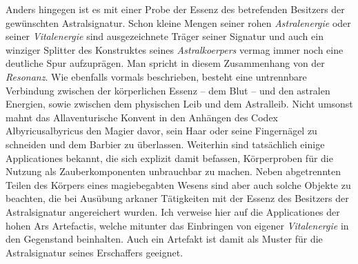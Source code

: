 \documentclass[a5paper,8pt]{book}
\begin{document}
\begin{multicols}{2}
Anders hingegen ist es mit einer Probe der Essenz des betrefenden Besitzers der gewünschten Astralsignatur. Schon kleine
Mengen seiner rohen \textit{Astralenergie} oder seiner \textit{Vitalenergie} sind ausgezeichnete Träger seiner Signatur und
auch ein winziger Splitter des Konstruktes seines \textit{Astralkoerpers} vermag immer noch eine deutliche Spur
aufzuprägen. Man spricht in diesem Zusammenhang von der \textit{Resonanz}. Wie ebenfalls vormals beschrieben, besteht eine
untrennbare Verbindung zwischen der körperlichen Essenz -- dem Blut -- und den astralen Energien, sowie zwischen dem
physischen Leib und dem Astralleib. Nicht umsonst mahnt das Allaventurische Konvent in den Anhängen des
Codex Albyricusalbyricus den Magier davor, sein Haar oder seine Fingernägel zu schneiden und dem Barbier zu
überlassen. Weiterhin sind tatsächlich einige Applicationes bekannt, die sich explizit damit befassen, Körperproben für
die Nutzung als Zauberkomponenten unbrauchbar zu machen. Neben abgetrennten Teilen des Körpers eines magiebegabten
Wesens sind aber auch solche Objekte zu beachten, die bei Ausübung arkaner Tätigkeiten mit der Essenz des Besitzers der
Astralsignatur angereichert wurden. Ich verweise hier auf die Applicationes der hohen Ars Artefactis, welche
mitunter das Einbringen von eigener \textit{Vitalenergie} in den Gegenstand beinhalten. Auch ein Artefakt ist damit als
Muster für die Astralsignatur seines Erschaffers geeignet.

\end{multicols}
\noindent\hrulefill
\end{document}
